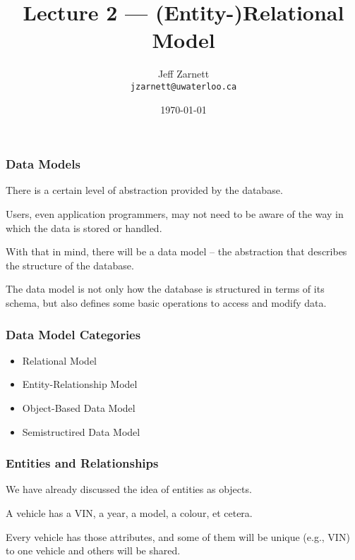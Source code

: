 

\title{Lecture  2 --- (Entity-)Relational Model }

\author{Jeff Zarnett \\ \small \texttt{jzarnett@uwaterloo.ca}}
\date{\today}




\begin{frame}
  \titlepage

 \end{frame}



\begin{frame}
\frametitle{Data Models}

There is a certain level of abstraction provided by the database. 

Users, even application programmers, may not need to be aware of the way in which the data is stored or handled.

 With that in mind, there will be a \alert{data model} -- the abstraction that describes the structure of the database. 
 
 The data model is not only how the database is structured in terms of its schema, but also defines some basic operations to access and modify data.


\end{frame}



\begin{frame}
\frametitle{Data Model Categories}

\begin{itemize}
	\item Relational Model
	\item Entity-Relationship Model
	\item Object-Based Data Model
	\item Semistructired Data Model
\end{itemize}

\end{frame}



\begin{frame}
\frametitle{Entities and Relationships}


We have already discussed the idea of entities as objects. 

A vehicle has a VIN, a year, a model, a colour, et cetera. 

Every vehicle has those attributes, and some of them will be unique (e.g., VIN) to one vehicle and others will be shared.

\end{frame}



